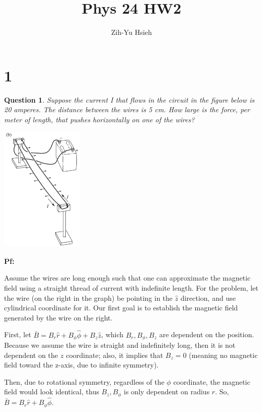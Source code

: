 \documentclass{article}
\title{Phys 24 HW2}
\author{Zih-Yu Hsieh}
\newtheorem{question}{Question}
\begin{document}
\maketitle

\section*{1}
\begin{myBox}[]{}
    \begin{question}
        Suppose the current I that flows in the circuit in the figure below is
        20 amperes. The distance between the wires is 5 cm. How large
        is the force, per meter of length, that pushes horizontally on one of
        the wires?
    \end{question}

    \begin{center}
        \includegraphics*[width=40mm]{Purcell 6.33.png}
    \end{center}
\end{myBox}

\textbf{Pf:}

Assume the wires are long enough such that one can approximate the magnetic field using a straight thread of current with indefinite length.
For the problem, let the wire (on the right in the graph) be pointing in the $\hat{z}$ direction, and use cylindrical coordinate for it.
Our first goal is to establish the magnetic field generated by the wire on the right.

\hfill

First, let $\bar{B}=B_r\hat{r}+B_\phi\hat{\phi}+B_z\hat{z}$, which $B_r,B_\phi,B_z$ are dependent on the position.
Because we assume the wire is straight and indefinitely long, then it is not dependent on the $z$ coordinate; also, it implies that $B_z=0$ (meaning no magnetic field toward the z-axis, due to infinite symmetry).

Then, due to rotational symmetry, regardless of the $\phi$ coordinate, the magnetic field would look identical, thus $B_z, B_\phi$ is only dependent on radius $r$.
So, $\bar{B}=B_r\hat{r}+B_\phi\hat{\phi}$.
\end{document}

